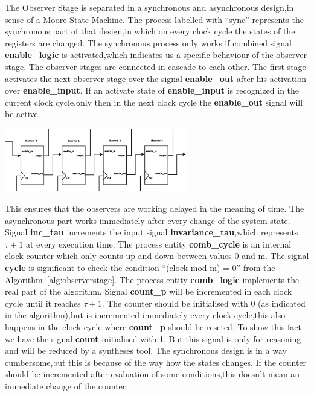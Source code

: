 The Observer Stage is separated in a synchronous and asynchronous design,in sense of a Moore State Machine.
The process labelled with ``sync'' represents the synchronous part of that design,in which on every clock cycle 
the states of the registers are changed.
The synchronous process only works if combined signal \textbf{enable\_logic} is activated,which indicates us a specific behaviour of the 
observer stage. The observer stages are connected in cascade to each other. The first stage activates the next observer stage over the signal
\textbf{enable\_out} after his activation over \textbf{enable\_input}.
If an activate state of \textbf{enable\_input} is recognized in the current clock cycle,only then in the next clock cycle the \textbf{enable\_out} signal will
be active.   
%
\begin{center}
\includegraphics[width=300px]{Chapter2/Figs/Raster/Observer-stage.png}
\end{center}
This ensures that the observers are working delayed in the meaning of time.
The asynchronous part works immediately after every change of the system state.  
Signal \textbf{inc\_tau} increments the input signal \textbf{invariance\_tau},which represents $\tau+1$ at every execution time.
The process entity \textbf{comb\_cycle} is an internal clock counter which only counts up and down between values 0 and m.
The signal \textbf{cycle} is significant to check the condition ``(clock mod m) = 0'' from the Algorithm~\ref{alg:observerstage}.
The process entity \textbf{comb\_logic} implements the real part of the algorithm.
Signal \textbf{count\_p} will be incremented in each clock cycle until it reaches $\tau+1$.
The counter should be initialised with 0 (as indicated in the algorithm),but is incremented immediately every clock cycle,this also happens in the clock cycle where \textbf{count\_p}
should be reseted.
To show this fact we have the signal \textbf{count} initialised with 1. But this signal is only for reasoning and will be reduced by a syntheses tool.  
The synchronous design is in a way cumbersome,but this is because of the way how the states changes.
If the counter should be incremented after evaluation of some conditions,this doesn't mean an immediate change of the counter.
